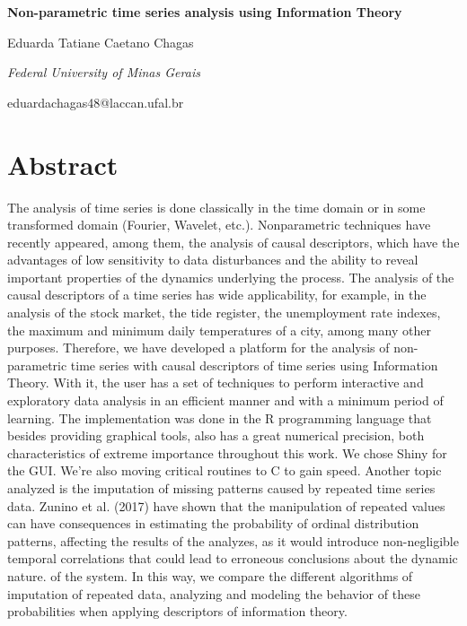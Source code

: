 \documentclass[12pt,letterpaper]{article}
\begin{document}
\begin{center}
	\textbf{\LARGE{Non-parametric time series analysis using Information Theory}}
	
	\vspace{7mm}
	\large{Eduarda Tatiane Caetano Chagas}
	
	\vspace{4mm}
	\textit{\large{Federal University of Minas Gerais}}
	
	\vspace{4mm}
	\small{eduardachagas48@laccan.ufal.br}
\end{center}

\vspace{7mm}

\section*{\centering Abstract}

The analysis of time series is done classically in the time domain or in some transformed domain (Fourier, Wavelet, etc.). Nonparametric techniques have recently appeared, among them, the analysis of causal descriptors, which have the advantages of low sensitivity to data disturbances and the ability to reveal important properties of the dynamics underlying the process.
The analysis of the causal descriptors of a time series has wide applicability, for example, in the analysis of the stock market, the tide register, the unemployment rate indexes, the maximum and minimum daily temperatures of a city, among many other purposes.
Therefore, we have developed a platform for the analysis of non-parametric time series with causal descriptors of time series using Information Theory. With it, the user has a set of techniques to perform interactive and exploratory data analysis in an efficient manner and with a minimum period of learning.
The implementation was done in the R programming language that besides providing graphical tools, also has a great numerical precision, both characteristics of extreme importance throughout this work. We chose Shiny for the GUI. We're also moving critical routines to C to gain speed.
Another topic analyzed is the imputation of missing patterns caused by repeated time series data.
Zunino et al. (2017) have shown that the manipulation of repeated values can have consequences in estimating the probability of ordinal distribution patterns, affecting the results of the analyzes, as it would introduce non-negligible temporal correlations that could lead to erroneous conclusions about the dynamic nature. of the system.
In this way, we compare the different algorithms of imputation of repeated data, analyzing and modeling the behavior of these probabilities when applying descriptors of information theory.
\end{document}
